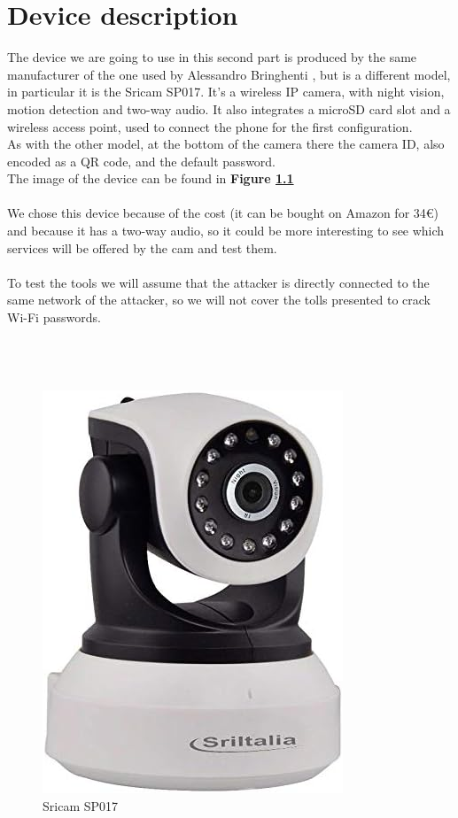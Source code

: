 \chapter{Device description}
The device we are going to use in this second part is produced by the same manufacturer
of the one used by Alessandro Bringhenti \cite{previouswork}, but is a different model, in particular
it is the Sricam SP017. It's a wireless IP camera, with night vision, motion detection
and two-way audio. It also integrates a microSD card slot and a wireless
access point, used to connect the phone for the first configuration.\\
As with the other model, at the bottom of the camera there the camera ID, also
encoded as a QR code, and the default password.\\
The image of the device can be found in \textbf{Figure \ref{fig:sp017}}\\\\
We chose this device because of the cost (it can be bought on Amazon for 34€) and
because it has a two-way audio, so it could be more interesting to see which services
will be offered by the cam and test them.\\\\
To test the tools we will assume that the attacker is directly connected to the
same network of the attacker, so we will not cover the tolls presented to 
crack Wi-Fi passwords.\\\\\\\\
\begin{figure}[h]
    \centering
    \includegraphics[scale=0.6]{cam.jpg}
    \caption{Sricam SP017}
    \label{fig:sp017}
\end{figure}
\newpage